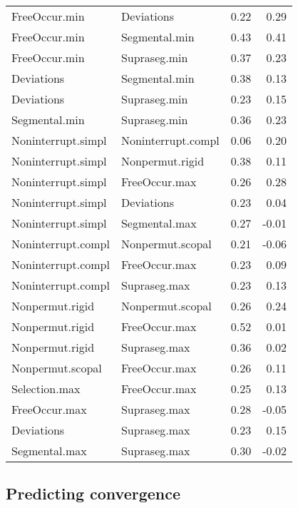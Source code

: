 \documentclass[output=paper,draftmode]{langscibook}
\begin{document}
\begin{longtable}{llrr}
FreeOccur.min & Deviations & \cellcolor{red!25}0.22 & \cellcolor{red!25}0.29\\
FreeOccur.min & Segmental.min & \cellcolor{red!45}0.43 & \cellcolor{red!45}0.41\\
FreeOccur.min & Supraseg.min & \cellcolor{red!45}0.37 & \cellcolor{red!25}0.23\\
Deviations & Segmental.min & \cellcolor{red!45}0.38 & 0.13\\
Deviations & Supraseg.min & \cellcolor{red!25}0.23 & 0.15\\
Segmental.min & Supraseg.min & \cellcolor{red!45}0.36 & \cellcolor{red!25}0.23\\
\midrule
Noninterrupt.simpl & Noninterrupt.compl & 0.06 & \cellcolor{red!25}0.20\\
Noninterrupt.simpl & Nonpermut.rigid & \cellcolor{red!45}0.38 & 0.11\\
Noninterrupt.simpl & FreeOccur.max & \cellcolor{red!25}0.26 & \cellcolor{red!25}0.28\\
Noninterrupt.simpl & Deviations & \cellcolor{red!25}0.23 & 0.04\\
Noninterrupt.simpl & Segmental.max & \cellcolor{red!25}0.27 & -0.01\\
Noninterrupt.compl & Nonpermut.scopal & \cellcolor{red!25}0.21 & -0.06\\
Noninterrupt.compl & FreeOccur.max & \cellcolor{red!25}0.23 & 0.09\\
Noninterrupt.compl & Supraseg.max & \cellcolor{red!25}0.23 & 0.13\\
Nonpermut.rigid & Nonpermut.scopal & \cellcolor{red!25}0.26 & \cellcolor{red!25}0.24\\
Nonpermut.rigid & FreeOccur.max & \cellcolor{red!45}0.52 & 0.01\\
Nonpermut.rigid & Supraseg.max & \cellcolor{red!45}0.36 & 0.02\\
Nonpermut.scopal & FreeOccur.max & \cellcolor{red!25}0.26 & 0.11\\
Selection.max & FreeOccur.max & \cellcolor{red!25}0.25 & 0.13\\
FreeOccur.max & Supraseg.max & \cellcolor{red!25}0.28 & -0.05\\
Deviations & Supraseg.max & \cellcolor{red!25}0.23 & 0.15\\
Segmental.max & Supraseg.max & \cellcolor{red!25}0.30 & -0.02\\
\bottomrule
\end{longtable}


\subsection{Predicting convergence}
\end{document}
